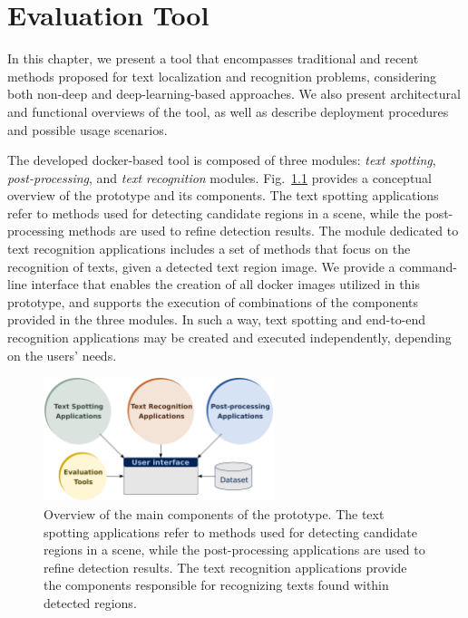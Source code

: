 \chapter{Evaluation Tool}
\label{chap:tool}

In this chapter, we present a tool that encompasses traditional and recent methods proposed for text localization and recognition problems, considering both non-deep and deep-learning-based approaches. We also present architectural and functional overviews of the tool, as well as describe deployment procedures and possible usage scenarios.

The developed docker-based tool is composed of three modules: \textit{text spotting}, \textit{post-processing}, and \textit{text recognition} modules. Fig.~\ref{fig:prototype-overview-simple} provides a conceptual overview of the prototype and its components. The text spotting applications refer to methods used for detecting candidate regions in a scene, while the post-processing methods are used to refine detection results. The module dedicated to text recognition applications includes a set of methods that focus on the recognition of texts, given a detected text region image. We provide a command-line interface that enables the creation of all docker images utilized in this prototype, and supports the execution of combinations of the components provided in the three modules. In such a way, text spotting and end-to-end recognition applications may be created and executed independently, depending on the users' needs.

\begin{figure}[h!]
  \centering
  \includegraphics[width=0.6\textwidth]{E4/version-2/figs/prototype-overview-simple.pdf}
  \caption{Overview of the main components of the prototype. The text spotting applications refer to methods used for detecting candidate regions in a scene, while the post-processing applications are used to refine detection results. The text recognition applications provide the components responsible for recognizing texts found within detected regions.}
  \label{fig:prototype-overview-simple}
\end{figure}

